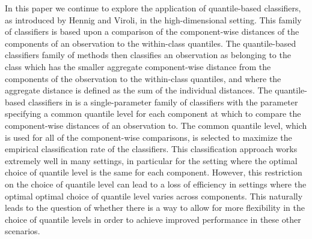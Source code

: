 In this paper we continue to explore the application of quantile-based
classifiers, as introduced by Hennig and Viroli, in the high-dimensional
setting.  This family of classifiers is based upon a comparison of the
component-wise distances of the components of an observation to the within-class
quantiles.  The quantile-based classifiers family of methods then classifies an
observation as belonging to the class which has the smaller aggregate
component-wise distance from the components of the observation to the
within-class quantiles, and where the aggregate distance is defined as the sum
of the individual distances.  The quantile-based classifiers in
\cite{hennig2016} is a single-parameter family of classifiers with the
parameter specifying a common quantile level for each component at which to
compare the component-wise distances of an observation to.  The common quantile
level, which is used for all of the component-wise comparisons, is selected to
maximize the empirical classification rate of the classifiers.  This
classification approach works extremely well in many settings, in particular for
the setting where the optimal choice of quantile level is the same for each
component.  However, this restriction on the choice of quantile level can lead
to a loss of efficiency in settings where the optimal optimal choice of quantile
level varies across components.  This naturally leads to the question of whether
there is a way to allow for more flexibility in the choice of quantile levels in
order to achieve improved performance in these other scenarios.

